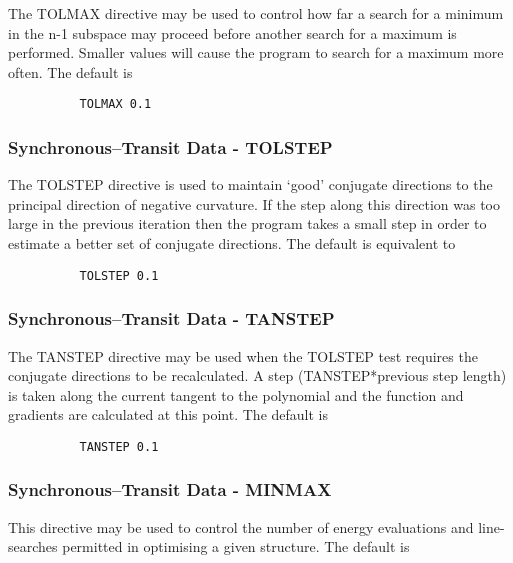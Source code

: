 \documentclass[11pt,fleqn]{article}
\begin{document}
The TOLMAX directive  may be used to control how
far a search for a minimum in the n-1 subspace \cite{bell} may proceed
before another search for a maximum is performed. 
Smaller values will
cause the program to search for a maximum more often. The
default is

{
\footnotesize
\begin{verbatim}
          TOLMAX 0.1
\end{verbatim}
}

\subsubsection[Synchronous--Transit Data - TOLSTEP]{Synchronous--Transit Data - TOLSTEP}

The TOLSTEP  directive
is used to maintain `good' conjugate directions to the principal
direction of negative curvature. If the step along this
direction was too large in the previous iteration then the program takes
a small step in order to estimate a better set of conjugate
directions. The default  is equivalent to

{
\footnotesize
\begin{verbatim}
          TOLSTEP 0.1
\end{verbatim}
}

\subsubsection[Synchronous--Transit Data - TANSTEP]{Synchronous--Transit Data - TANSTEP}

The TANSTEP directive may be used when the
TOLSTEP test requires the conjugate directions to be recalculated.
A step (TANSTEP*previous step length) is taken along the current
tangent to the polynomial and the function and gradients are
calculated at this point. The default is

{
\footnotesize
\begin{verbatim}
          TANSTEP 0.1
\end{verbatim}
}

\subsubsection[Synchronous--Transit Data - MINMAX]{Synchronous--Transit Data - MINMAX}

This directive may be used to
control the number of energy evaluations and line-searches permitted
in optimising a given structure. The default is
\end{document}
